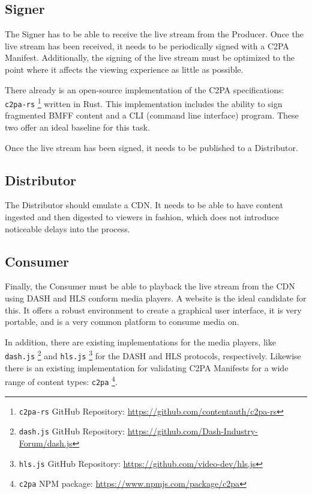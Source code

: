 \subsection{Signer}

The Signer has to be able to receive the live stream from the Producer. Once the live stream has been received, it needs to be periodically signed with a C2PA Manifest. Additionally, the signing of the live stream must be optimized to the point where it affects the viewing experience as little as possible.

There already is an open-source implementation of the C2PA specifications: \texttt{c2pa-rs} \footnote{\texttt{c2pa-rs} GitHub Repository: \url{https://github.com/contentauth/c2pa-rs}} written in Rust. This implementation includes the ability to sign fragmented BMFF content and a CLI (command line interface) program. These two offer an ideal baseline for this task.

Once the live stream has been signed, it needs to be published to a Distributor.

\subsection{Distributor}

The Distributor should emulate a CDN. It needs to be able to have content ingested and then digested to viewers in fashion, which does not introduce noticeable delays into the process.

\subsection{Consumer}

Finally, the Consumer must be able to playback the live stream from the CDN using DASH and HLS conform media players. A website is the ideal candidate for this. It offers a robust environment to create a graphical user interface, it is very portable, and is a very common platform to consume media on.

In addition, there are existing implementations for the media players, like \texttt{dash.js} \footnote{\texttt{dash.js} GitHub Repository: \url{https://github.com/Dash-Industry-Forum/dash.js}} and \texttt{hls.js} \footnote{\texttt{hls.js} GitHub Repository: \url{https://github.com/video-dev/hls.js}} for the DASH and HLS protocols, respectively. Likewise there is an existing implementation for validating C2PA Manifests for a wide range of content types: \texttt{c2pa} \footnote{\texttt{c2pa} NPM package: \url{https://www.npmjs.com/package/c2pa}}.